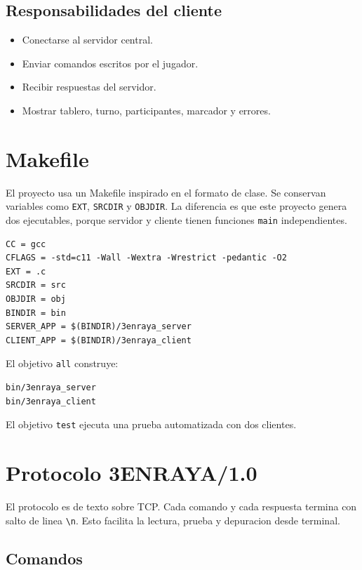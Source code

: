 \documentclass[12pt,a4paper]{article}
\begin{document}
\subsection{Responsabilidades del cliente}

\begin{itemize}
    \item Conectarse al servidor central.
    \item Enviar comandos escritos por el jugador.
    \item Recibir respuestas del servidor.
    \item Mostrar tablero, turno, participantes, marcador y errores.
\end{itemize}

\section{Makefile}

El proyecto usa un Makefile inspirado en el formato de clase. Se conservan
variables como \texttt{EXT}, \texttt{SRCDIR} y \texttt{OBJDIR}. La diferencia
es que este proyecto genera dos ejecutables, porque servidor y cliente tienen
funciones \texttt{main} independientes.

\begin{lstlisting}[style=code]
CC = gcc
CFLAGS = -std=c11 -Wall -Wextra -Wrestrict -pedantic -O2
EXT = .c
SRCDIR = src
OBJDIR = obj
BINDIR = bin
SERVER_APP = $(BINDIR)/3enraya_server
CLIENT_APP = $(BINDIR)/3enraya_client
\end{lstlisting}

El objetivo \texttt{all} construye:

\begin{lstlisting}[style=code]
bin/3enraya_server
bin/3enraya_client
\end{lstlisting}

El objetivo \texttt{test} ejecuta una prueba automatizada con dos clientes.

\section{Protocolo 3ENRAYA/1.0}

El protocolo es de texto sobre TCP. Cada comando y cada respuesta termina con
salto de linea \texttt{\textbackslash n}. Esto facilita la lectura, prueba y
depuracion desde terminal.

\subsection{Comandos}
\end{document}
